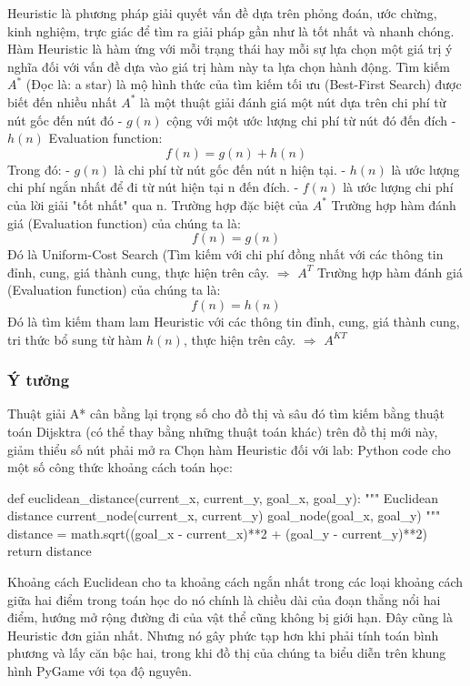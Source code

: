 \documentclass{article}
\begin{document}
Heuristic là phương pháp giải quyết vấn đề dựa trên phỏng đoán, ước chừng, kinh nghiệm, trực giác để tìm ra giải pháp gần như là tốt nhất và nhanh chóng.\newline
Hàm Heuristic là hàm ứng với mỗi trạng thái hay mỗi sự lựa chọn một giá trị ý nghĩa đối với vấn đề dựa vào giá trị hàm này ta lựa chọn hành động.\newline
Tìm kiếm $A^{*}$ (Đọc là: a star) là mộ hình thức của tìm kiếm tối ưu (Best-First Search) được biết đến nhiều nhất  \newline
$A^{*}$ là một thuật giải đánh giá một nút dựa trên chi phí từ nút gốc đến nút đó - $g(n)$ cộng với một ước lượng chi phí từ nút đó đến đích - $h(n)$ \newline
Evaluation function:
$$f(n) = g(n) + h(n)$$
Trong đó:\newline
- $g(n)$ là chi phí từ nút gốc đến nút n hiện tại.\newline
- $h(n)$ là ước lượng chi phí ngắn nhất để đi từ nút hiện tại n đến đích.\newline
- $f(n)$ là ước lượng chi phí của lời giải "tốt nhất" qua n.\newline
\newline
Trường hợp đặc biệt của $A^{*}$
\newline
Trường hợp hàm đánh giá (Evaluation function) của chúng ta là:
$$f(n) = g(n)$$
Đó là Uniform-Cost Search (Tìm kiếm với chi phí đồng nhất với các thông tin đỉnh, cung, giá thành cung, thực hiện trên cây. $\Longrightarrow$ $A^{T}$
\newline
Trường hợp hàm đánh giá (Evaluation function) của chúng ta là:
$$f(n) = h(n)$$
Đó là tìm kiếm tham lam Heuristic với các thông tin đỉnh, cung, giá thành cung, tri thức bổ sung từ hàm $h(n)$, thực hiện trên cây. $\Longrightarrow$ $A^{KT}$


\subsubsection{Ý tưởng}
Thuật giải A* cân bằng lại trọng số cho đồ thị và sâu đó tìm kiếm bằng thuật toán Dijsktra (có thể thay bằng những thuật toán khác) trên đồ thị mới này, giảm thiểu số nút phải mở ra\newline
Chọn hàm Heuristic đối với lab:\newline
Python code cho một số công thức khoảng cách toán học:\newline
\begin{python}
def euclidean_distance(current_x, current_y, goal_x, goal_y):
    """
    Euclidean distance
    current_node(current_x, current_y)
    goal_node(goal_x, goal_y)
    """
    distance = math.sqrt((goal_x - current_x)**2 + (goal_y - current_y)**2)
    return distance
\end{python}
Khoảng cách Euclidean cho ta khoảng cách ngắn nhất trong các loại khoảng cách giữa hai điểm trong toán học do nó chính là chiều dài của đoạn thẳng nổi hai điểm, hướng mở rộng đường đi của vật thể cũng không bị giới hạn. Đây cũng là Heuristic đơn giản nhất. Nhưng nó gây phức tạp hơn khi phải tính toán bình phương và lấy căn bậc hai, trong khi đồ thị của chúng ta biểu diễn trên khung hình PyGame với tọa độ nguyên. 
\end{document}
